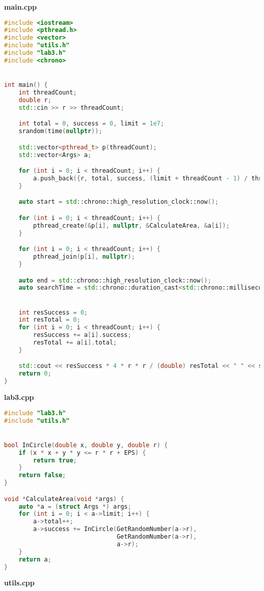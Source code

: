 \documentclass[pdf, unicode, 12pt, a4paper,oneside,fleqn]{article}
\begin{document}
{\large\textbf{main.cpp}}

\begin{lstlisting}[language=C++]
#include <iostream>
#include <pthread.h>
#include <vector>
#include "utils.h"
#include "lab3.h"
#include <chrono>


int main() {
    int threadCount;
    double r;
    std::cin >> r >> threadCount;

    int total = 0, success = 0, limit = 1e7;
    srandom(time(nullptr));

    std::vector<pthread_t> p(threadCount);
    std::vector<Args> a;

    for (int i = 0; i < threadCount; i++) {
        a.push_back({r, total, success, (limit + threadCount - 1) / threadCount});
    }

    auto start = std::chrono::high_resolution_clock::now();

    for (int i = 0; i < threadCount; i++) {
        pthread_create(&p[i], nullptr, &CalculateArea, &a[i]);
    }

    for (int i = 0; i < threadCount; i++) {
        pthread_join(p[i], nullptr);
    }

    auto end = std::chrono::high_resolution_clock::now();
    auto searchTime = std::chrono::duration_cast<std::chrono::milliseconds>(end - start).count();


    int resSuccess = 0;
    int resTotal = 0;
    for (int i = 0; i < threadCount; i++) {
        resSuccess += a[i].success;
        resTotal += a[i].total;
    }

    std::cout << resSuccess * 4 * r * r / (double) resTotal << " " << searchTime;
    return 0;
}
\end{lstlisting}

{\large\textbf{lab3.cpp}}

\begin{lstlisting}[language=C++]
#include "lab3.h"
#include "utils.h"


bool InCircle(double x, double y, double r) {
    if (x * x + y * y <= r * r + EPS) {
        return true;
    }
    return false;
}

void *CalculateArea(void *args) {
    auto *a = (struct Args *) args;
    for (int i = 0; i < a->limit; i++) {
        a->total++;
        a->success += InCircle(GetRandomNumber(a->r),
                               GetRandomNumber(a->r),
                               a->r);
    }
    return a;
}
\end{lstlisting}


{\large\textbf{utils.cpp}}
\end{document}
